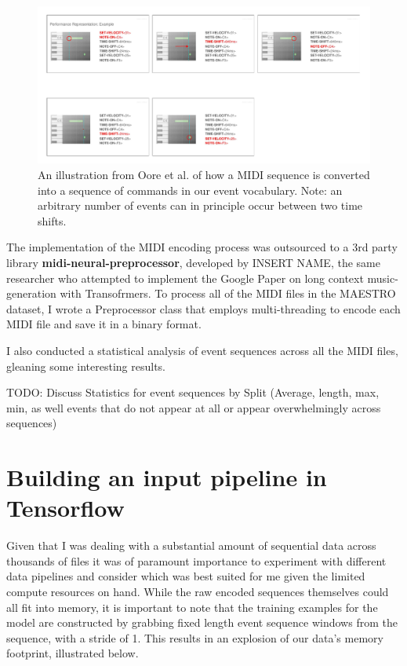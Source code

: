 \documentclass[../main.tex]{subfiles}
\begin{document}
\begin{figure}[htpb]
    \centering
    \includegraphics[width=1\textwidth]{imgs/midi_encoding.png}
    \caption{An illustration from Oore et al. of how a MIDI sequence is converted into a sequence of commands in our event vocabulary. Note: an arbitrary number of events can in principle occur between two time shifts.}
    \label{fig:fig3}
\end{figure}

The implementation of the MIDI encoding process was outsourced to a 3rd party library \textbf{midi-neural-preprocessor}, developed by {INSERT NAME}, the same researcher who attempted to implement the Google Paper on long context music-generation with Transofrmers. To process all of the MIDI files in the MAESTRO dataset, I wrote a Preprocessor class that employs multi-threading to encode each MIDI file and save it in a binary format.


I also conducted a statistical analysis of event sequences across all the MIDI files, gleaning some interesting results.

TODO: Discuss Statistics for event sequences by Split (Average, length, max, min, as well events that do not appear at all or appear overwhelmingly across sequences)


\section{Building an input pipeline in Tensorflow}
Given that I was  dealing with a substantial amount of sequential data across thousands of files it was of paramount importance to experiment with different data pipelines and consider which was best suited for me given the limited compute resources on hand. While the raw encoded sequences themselves could all fit into memory, it is important to note that the training examples for the model are constructed by grabbing fixed length event sequence windows from the sequence, with a stride of 1. This results in an explosion of our data's memory footprint, illustrated below. 
\end{document}
